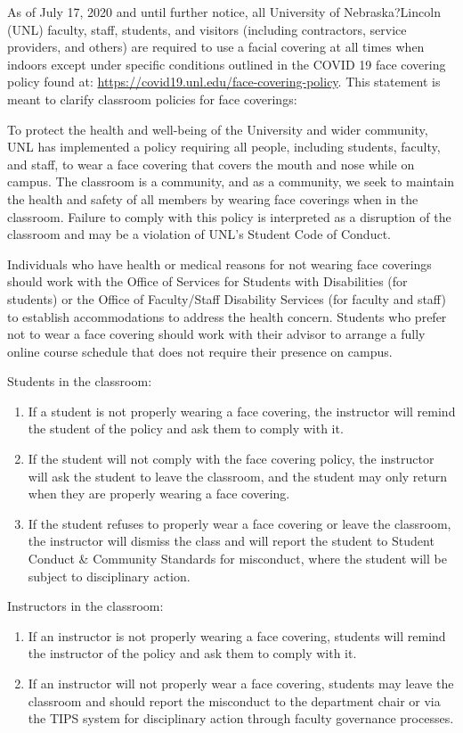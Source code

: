 \documentclass[12pt]{scrartcl}
\begin{document}
As of July 17, 2020 and until further notice, all University of 
Nebraska?Lincoln (UNL) faculty, staff, students, and visitors 
(including contractors, service providers, and others) are required 
to use a facial covering at all times when indoors except under 
specific conditions outlined in the COVID 19 face covering policy 
found at: \url{https://covid19.unl.edu/face-covering-policy}. This 
statement is meant to clarify classroom policies for face coverings:

To protect the health and well-being of the University and wider 
community, UNL has implemented a policy requiring all people, 
including students, faculty, and staff, to wear a face covering 
that covers the mouth and nose while on campus. The classroom is 
a community, and as a community, we seek to maintain the health 
and safety of all members by wearing face coverings when in the 
classroom. Failure to comply with this policy is interpreted as 
a disruption of the classroom and may be a violation of UNL's 
Student Code of Conduct.

Individuals who have health or medical reasons for not wearing 
face coverings should work with the Office of Services for 
Students with Disabilities (for students) or the Office of 
Faculty/Staff Disability Services (for faculty and staff) to 
establish accommodations to address the health concern. Students 
who prefer not to wear a face covering should work with their 
advisor to arrange a fully online course schedule that does 
not require their presence on campus.

Students in the classroom:
\begin{enumerate}
  \item If a student is not properly wearing a face covering, 
  the instructor will remind the student of the policy and ask 
  them to comply with it.
  \item If the student will not comply with the face covering policy, 
  the instructor will ask the student to leave the classroom, 
  and the student may only return when they are properly wearing 
  a face covering.
  \item If the student refuses to properly wear a face covering 
  or leave the classroom, the instructor will dismiss the class 
  and will report the student to Student Conduct \& Community 
  Standards for misconduct, where the student will be subject to disciplinary action.
\end{enumerate}

Instructors in the classroom:
\begin{enumerate}
  \item If an instructor is not properly wearing a face covering, 
  students will remind the instructor of the policy and ask them 
  to comply with it.
  \item If an instructor will not properly wear a face covering, 
  students may leave the classroom and should report the misconduct 
  to the department chair or via the TIPS system for disciplinary 
  action through faculty governance processes.
\end{enumerate}
\end{document}
